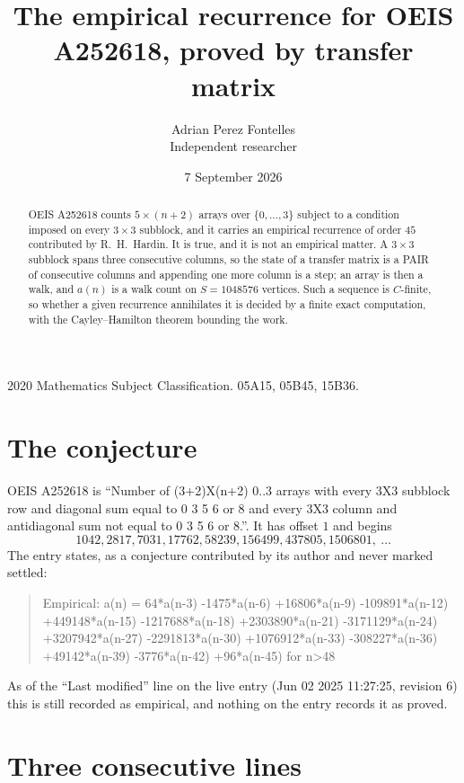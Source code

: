 \documentclass[11pt,a4paper]{article}
\title{The empirical recurrence for OEIS A252618, proved by transfer matrix}
\author{Adrian Perez Fontelles\\ \small Independent researcher}
\date{7 September 2026}
\theoremstyle{plain}
\theoremstyle{definition}
\begin{document}
\maketitle

\begin{abstract}
OEIS A252618 counts $5\times(n+2)$ arrays over $\{0,\dots,3\}$ subject to a condition imposed on
every $3\times3$ subblock, and it carries an empirical recurrence of order $45$
contributed by R.~H.~Hardin. It is true, and it is not an empirical matter. A $3\times3$
subblock spans three consecutive columns, so the state of a transfer matrix is a PAIR of
consecutive columns and appending one more column is a step; an array is then a walk, and
$a(n)$ is a walk count on $S=1048576$ vertices. Such a sequence is $C$-finite, so whether a given
recurrence annihilates it is decided by a finite exact computation, with the Cayley--Hamilton
theorem bounding the work.
\end{abstract}

\noindent\small 2020 Mathematics Subject Classification. 05A15, 05B45, 15B36.\normalsize

\section{The conjecture}

OEIS A252618 is ``Number of (3+2)X(n+2) 0..3 arrays with every 3X3 subblock row and diagonal sum equal to 0 3 5 6 or 8 and every 3X3 column and antidiagonal sum not equal to 0 3 5 6 or 8.''. It has offset $1$ and begins
\[
1042, 2817, 7031, 17762, 58239, 156499, 437805, 1506801,\ \dots
\]
The entry states, as a conjecture contributed by its author and never marked settled:
\begin{quote}
Empirical: a(n) = 64*a(n-3) -1475*a(n-6) +16806*a(n-9) -109891*a(n-12) +449148*a(n-15) -1217688*a(n-18) +2303890*a(n-21) -3171129*a(n-24) +3207942*a(n-27) -2291813*a(n-30) +1076912*a(n-33) -308227*a(n-36) +49142*a(n-39) -3776*a(n-42) +96*a(n-45) for n>48
\end{quote}
As of the ``Last modified'' line on the live entry (Jun 02 2025 11:27:25, revision 6) this is still
recorded as empirical, and nothing on the entry records it as proved.

\section{Three consecutive lines}
\end{document}
